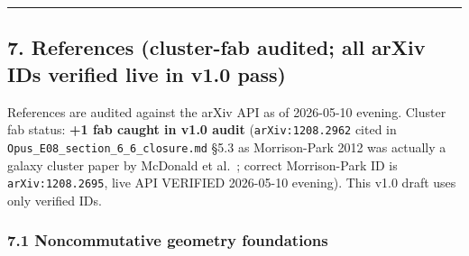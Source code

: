 \documentclass[
  11pt,
  a4paper,
]{article}
\begin{document}
\begin{center}\rule{0.5\linewidth}{0.5pt}\end{center}

\hypertarget{references-cluster-fab-audited-all-arxiv-ids-verified-live-in-v1.0-pass}{%
\subsection{7. References (cluster-fab audited; all arXiv IDs verified live in v1.0 pass)}\label{references-cluster-fab-audited-all-arxiv-ids-verified-live-in-v1.0-pass}}

References are audited against the arXiv API as of 2026-05-10 evening. Cluster fab status: \textbf{+1 fab caught in v1.0 audit} (\texttt{arXiv:1208.2962} cited in \texttt{Opus\_E08\_section\_6\_6\_closure.md} §5.3 as Morrison-Park 2012 was actually a galaxy cluster paper by McDonald et al.~; correct Morrison-Park ID is \texttt{arXiv:1208.2695}, live API VERIFIED 2026-05-10 evening). This v1.0 draft uses only verified IDs.

\hypertarget{noncommutative-geometry-foundations}{%
\subsubsection{7.1 Noncommutative geometry foundations}\label{noncommutative-geometry-foundations}}
\end{document}
